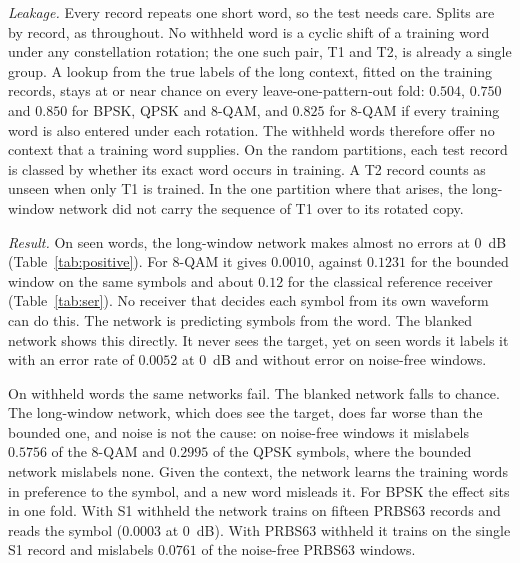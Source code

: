 \documentclass{ieeeaccess}
\begin{document}
\emph{Leakage.} Every record repeats one short word, so the test needs care.
Splits are by record, as throughout. No withheld word is a cyclic shift of a
training word under any constellation rotation; the one such pair, T1 and T2,
is already a single group. A lookup from the true labels of the long context,
fitted on the training records, stays at or near chance on every
leave-one-pattern-out fold: $0.504$, $0.750$ and $0.850$ for BPSK, QPSK and
8-QAM, and $0.825$ for 8-QAM if every training word is also entered under each
rotation. The withheld words therefore offer no context that a training word
supplies. On the random partitions, each test record is classed by whether its
exact word occurs in training. A T2 record counts as unseen when only T1 is
trained. In the one partition where that arises, the long-window network did
not carry the sequence of T1 over to its rotated copy.

\emph{Result.} On seen words, the long-window network makes almost no errors at
$0$~dB (Table~\ref{tab:positive}). For 8-QAM it gives $0.0010$, against
$0.1231$ for the bounded window on the same symbols and about $0.12$ for the
classical reference receiver (Table~\ref{tab:ser}). No receiver that decides
each symbol from its own waveform can do this. The network is predicting
symbols from the word. The blanked network shows this directly. It never sees
the target, yet on seen words it labels it with an error rate of $0.0052$ at
$0$~dB and without error on noise-free windows.

On withheld words the same networks fail. The blanked network falls to chance.
The long-window network, which does see the target, does far worse than the
bounded one, and noise is not the cause: on noise-free windows it mislabels
$0.5756$ of the 8-QAM and $0.2995$ of the QPSK symbols, where the bounded
network mislabels none. Given the context, the network learns the training
words in preference to the symbol, and a new word misleads it. For BPSK the
effect sits in one fold. With S1 withheld the network trains on fifteen PRBS63
records and reads the symbol ($0.0003$ at $0$~dB). With PRBS63 withheld it
trains on the single S1 record and mislabels $0.0761$ of the noise-free PRBS63
windows.
\end{document}
